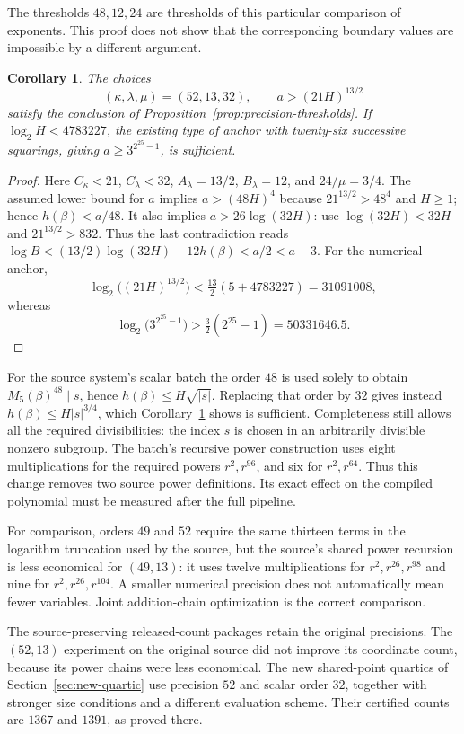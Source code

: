 \documentclass[11pt]{article}
\newtheorem{corollary}[theorem]{Corollary}
\theoremstyle{definition}
\begin{document}
The thresholds $48,12,24$ are thresholds of this particular comparison
of exponents. This proof does not show that the corresponding boundary
values are impossible by a different argument.

\begin{corollary}\label{cor:scalar32}
The choices
\[
 (\kappa,\lambda,\mu)=(52,13,32),\qquad a>(21H)^{13/2}
\]
satisfy the conclusion of Proposition~\ref{prop:precision-thresholds}.
If $\log_2H<4783227$, the existing type of anchor with twenty-six
successive squarings, giving $a\ge3^{2^{25}-1}$, is sufficient.
\end{corollary}
\begin{proof}
Here $C_\kappa<21$, $C_\lambda<32$,
$A_\lambda=13/2$, $B_\lambda=12$, and $24/\mu=3/4$.
The assumed lower bound for $a$ implies $a>(48H)^4$ because
$21^{13/2}>48^4$ and $H\ge1$; hence $h(\beta)<a/48$.
It also implies $a>26\log(32H)$: use $\log(32H)<32H$ and
$21^{13/2}>832$. Thus the last contradiction reads
$\log B<(13/2)\log(32H)+12h(\beta)<a/2<a-3$.
For the numerical anchor,
\[
 \log_2\big((21H)^{13/2}\big)
 <\tfrac{13}{2}(5+4783227)=31091008,
\]
whereas
\[
 \log_2\big(3^{2^{25}-1}\big)
 >\tfrac32(2^{25}-1)=50331646.5.
\]
\end{proof}

For the source system's scalar batch the order $48$ is used solely to
obtain $M_5(\beta)^{48}\mid s$, hence
$h(\beta)\le H\sqrt{|s|}$. Replacing that order by $32$ gives instead
$h(\beta)\le H|s|^{3/4}$, which Corollary~\ref{cor:scalar32} shows
is sufficient. Completeness still allows all the required divisibilities:
the index $s$ is chosen in an arbitrarily divisible nonzero subgroup.
The batch's recursive power construction uses eight multiplications
for the required powers $r^2,r^{96}$, and six for $r^2,r^{64}$.
Thus this change removes two source power definitions. Its exact effect
on the compiled polynomial must be measured after the full pipeline.

For comparison, orders $49$ and $52$ require the same thirteen terms
in the logarithm truncation used by the source, but the source's shared
power recursion is less economical for $(49,13)$: it uses twelve
multiplications for $r^2,r^{26},r^{98}$ and nine for
$r^2,r^{26},r^{104}$. A smaller numerical precision does not automatically
mean fewer variables. Joint addition-chain optimization is the correct
comparison.


The source-preserving released-count packages retain the original precisions.
The $(52,13)$ experiment on the original source did not improve its
coordinate count, because its power chains were less economical.
The new shared-point quartics of Section~\ref{sec:new-quartic}
use precision $52$ and scalar order $32$, together with stronger
size conditions and a different evaluation scheme. Their certified
counts are $1367$ and $1391$, as proved there.
\end{document}
